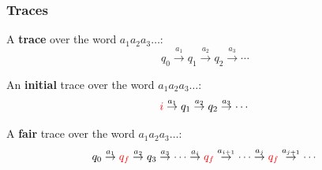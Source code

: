 \documentclass{beamer}
\newcommand{\trans}[1]{\overset{#1}{\rightarrow}}
\begin{document}
\begin{frame}
\frametitle{Traces}
A \textbf{trace} over the word $a_1a_2a_3\dots$:
\[ q_0 \trans{a_1} q_1 \trans{a_2} q_2 \trans{a_3} \cdots \]

\pause
An \textbf{initial} trace over the word $a_1a_2a_3 \dots$:
\[ \textcolor{red}{i} \trans{a_1} q_1 \trans{a_2} q_2 \trans{a_3} \cdots \]

\pause
A \textbf{fair} trace over the word $a_1a_2a_3\dots$:
\[ q_0 \trans{a_1} \textcolor{red}{q_f} \trans{a_2} q_3 \trans{a_3} \cdots \trans{a_i}
\textcolor{red}{q_f} \trans{a_{i+1}} \cdots \trans{a_j} \textcolor{red}{q_f} \trans{a_{j+1}} \cdots\]

%
\end{frame}
\end{document}
